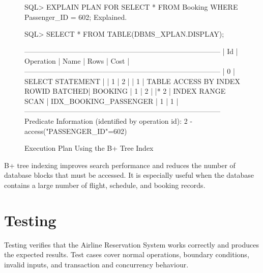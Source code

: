 \documentclass[12pt,a4paper]{article}
\begin{document}
\begin{figure}[H]
\begin{terminal}
SQL> EXPLAIN PLAN FOR SELECT * FROM Booking WHERE Passenger_ID = 602;
Explained.

SQL> SELECT * FROM TABLE(DBMS_XPLAN.DISPLAY);

-----------------------------------------------------------------------------------
| Id | Operation                           | Name                  | Rows | Cost |
-----------------------------------------------------------------------------------
|  0 | SELECT STATEMENT                    |                       |    1 |    2 |
|  1 |  TABLE ACCESS BY INDEX ROWID BATCHED| BOOKING               |    1 |    2 |
|* 2 |   INDEX RANGE SCAN                  | IDX_BOOKING_PASSENGER |    1 |    1 |
-----------------------------------------------------------------------------------
Predicate Information (identified by operation id):
   2 - access("PASSENGER_ID"=602)
\end{terminal}
\caption{Execution Plan Using the B+ Tree Index}
\end{figure}
B+ tree indexing improves search performance and reduces the number of database blocks that must be
accessed. It is especially useful when the database contains a large number of flight, schedule, and
booking records.

\section{Testing}
Testing verifies that the Airline Reservation System works correctly and produces the expected results.
Test cases cover normal operations, boundary conditions, invalid inputs, and transaction and concurrency
behaviour.
\end{document}
